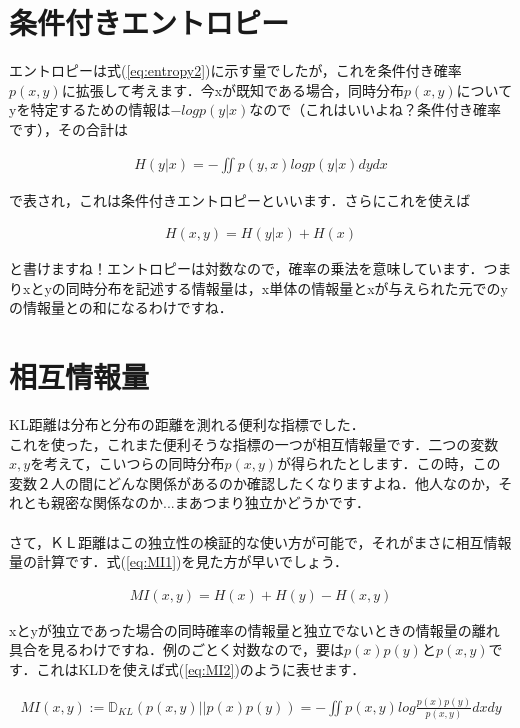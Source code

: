 \documentclass[11pt,a4paper,uplatex]{ujreport}
\begin{document}
\section{条件付きエントロピー}
エントロピーは式(\ref{eq:entropy2})に示す量でしたが，これを条件付き確率$p(x,y)$に拡張して考えます．今xが既知である場合，同時分布$p(x,y)$についてyを特定するための情報は$-log p(y|x)$なので（これはいいよね？条件付き確率です），その合計は

\begin{eqnarray}
\label{eq:cond_entropy1}
H(y|x) = - \iint p(y,x) log p(y|x) dy dx
\end{eqnarray}

で表され，これは条件付きエントロピーといいます\cite{prml}\cite{dist}．さらにこれを使えば

\begin{eqnarray}
\label{eq:cond_entropy2}
H(x,y) = H(y|x) + H(x)
\end{eqnarray}

と書けますね！エントロピーは対数なので，確率の乗法を意味しています．つまりxとyの同時分布を記述する情報量は，x単体の情報量とxが与えられた元でのyの情報量との和になるわけですね．

\section{相互情報量}
KL距離は分布と分布の距離を測れる便利な指標でした．\\

これを使った，これまた便利そうな指標の一つが相互情報量です．二つの変数$x, y$を考えて，こいつらの同時分布$p(x,y)$が得られたとします．この時，この変数２人の間にどんな関係があるのか確認したくなりますよね．他人なのか，それとも親密な関係なのか...まあつまり独立かどうかです．\\
\\

さて，ＫＬ距離はこの独立性の検証的な使い方が可能で，それがまさに相互情報量の計算です．式(\ref{eq:MI1})を見た方が早いでしょう\cite{dist}．

\begin{eqnarray}
\label{eq:MI1}
MI(x,y) = H(x) + H(y) - H(x,y)
\end{eqnarray}

xとyが独立であった場合の同時確率の情報量と独立でないときの情報量の離れ具合を見るわけですね．例のごとく対数なので，要は$p(x)p(y)とp(x,y)$です．これはKLDを使えば式(\ref{eq:MI2})のように表せます．

\begin{eqnarray}
\label{eq:MI2}
  MI(x,y) := \mathbb{D}_{KL}(p(x,y) || p(x)p(y)) = -\iint p(x,y) log \frac{p(x)p(y)}{p(x,y)} dxdy
\end{eqnarray}
\end{document}
